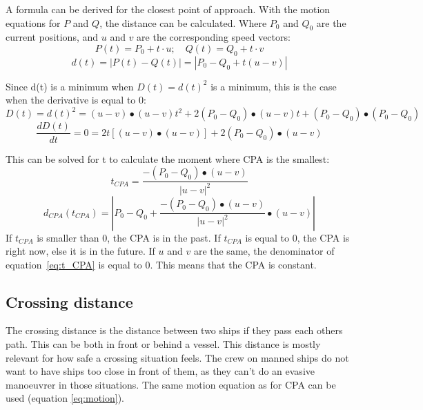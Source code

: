 A formula can be derived for the closest point of approach. With the motion equations for $P$ and $Q$, the distance can be calculated. Where $P_0$ and $Q_0$ are the current positions, and $u$ and $v$ are the corresponding speed vectors:
\begin{equation}
	\label{eq:motion}
	P(t) = P_0 + t \cdot u ;\quad  Q(t) = Q_0 + t \cdot v
\end{equation}
\begin{equation}
	d(t) = |P(t) - Q(t)| = |P_0 - Q_0 + t (u - v)|
\end{equation}

Since d(t) is a minimum when $D(t) = d(t)^2$ is a minimum, this is the case when the derivative is equal to 0:
\begin{equation}
	D(t) = d(t)^2 = (u - v) \bullet (u - v) t^2 + 2 (P_0 - Q_0) \bullet (u - v) t + (P_0 - Q_0) \bullet (P_0 - Q_0)
\end{equation}
\begin{equation}
\frac{d D(t)}{dt} = 0 = 2t[(u - v) \bullet (u-v)] + 2 (P_0 - Q_0) \bullet (u - v)
\end{equation}

This can be solved for t to calculate the moment where CPA is the smallest:
\begin{equation}
	\label{eq:t_CPA}
	t_{CPA} = \frac{-(P_0 - Q_0) \bullet (u - v)}{|u - v|^2}
\end{equation}
\begin{equation}
	d_{CPA}(t_{CPA}) = |P_0 - Q_0 + \frac{-(P_0 - Q_0) \bullet (u - v)}{|u - v|^2} \bullet (u - v)|
\end{equation}
If $t_{CPA}$ is smaller than 0, the CPA is in the past. If $t_{CPA}$ is equal to 0, the CPA is right now, else it is in the future. If $u$ and $v$ are the same, the denominator of equation~\ref{eq:t_CPA} is equal to 0. This means that the CPA is constant.

\subsection{Crossing distance}
The crossing distance is the distance between two ships if they pass each others path. This can be both in front or behind a vessel. This distance is mostly relevant for how safe a crossing situation feels. The crew on manned ships do not want to have ships too close in front of them, as they can't do an evasive manoeuvrer in those situations. The same motion equation as for CPA can be used (equation \ref{eq:motion}). 

